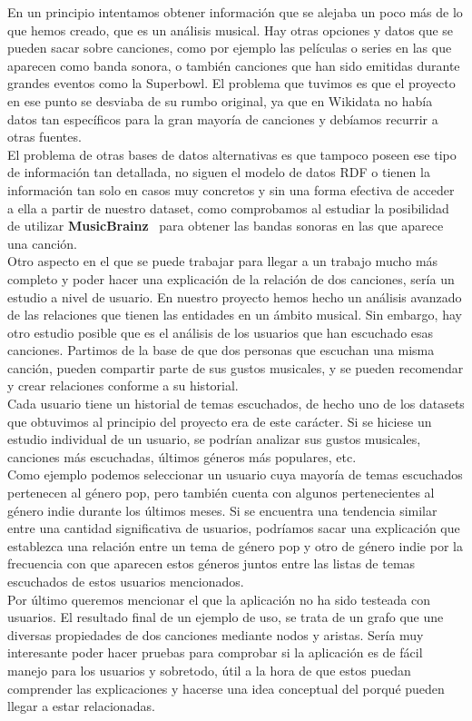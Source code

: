 En un principio intentamos obtener información que se alejaba un poco más de lo que hemos creado, que es un análisis musical. Hay otras opciones y datos que se pueden sacar sobre canciones, como por ejemplo las películas o series en las que aparecen como banda sonora, o también canciones que han sido emitidas durante grandes eventos como la Superbowl. El problema que tuvimos es que el proyecto en ese punto se desviaba de su rumbo original, ya que en Wikidata no había datos tan específicos para la gran mayoría de canciones y debíamos recurrir a otras fuentes.\\

El problema de otras bases de datos alternativas es que tampoco poseen ese tipo de información tan detallada, no siguen el modelo de datos RDF o tienen la información tan solo en casos muy concretos y sin una forma efectiva de acceder a ella a partir de nuestro dataset, como comprobamos al estudiar la posibilidad de utilizar \textbf{MusicBrainz}~\cite{musicbrainz} para obtener las bandas sonoras en las que aparece una canción.\\

Otro aspecto en el que se puede trabajar para llegar a un trabajo mucho más completo y poder hacer una explicación de la relación de dos canciones, sería un estudio a nivel de usuario.
En nuestro proyecto hemos hecho un análisis avanzado de las relaciones que tienen las entidades en un ámbito musical. Sin embargo, hay otro estudio posible que es el análisis de los usuarios que han escuchado esas canciones. Partimos de la base de que dos personas que escuchan una misma canción, pueden compartir parte de sus gustos musicales, y se pueden recomendar y crear relaciones conforme a su historial.\\

Cada usuario tiene un historial de temas escuchados, de hecho uno de los datasets que obtuvimos al principio del proyecto era de este carácter. Si se hiciese un estudio individual de un usuario, se podrían analizar sus gustos musicales, canciones más escuchadas, últimos géneros más populares, etc.\\

Como ejemplo podemos seleccionar un usuario cuya mayoría de temas escuchados pertenecen al género pop, pero también cuenta con algunos pertenecientes al género indie durante los últimos meses. Si se encuentra una tendencia similar entre una cantidad significativa de usuarios, podríamos sacar una explicación que establezca una relación entre un tema de género pop y otro de género indie por la frecuencia con que aparecen estos géneros juntos entre las listas de temas escuchados de estos usuarios mencionados.\\

Por último queremos mencionar el que la aplicación no ha sido testeada con usuarios. El resultado final de un ejemplo de uso, se trata de un grafo que une diversas propiedades de dos canciones mediante nodos y aristas. Sería muy interesante poder hacer pruebas para comprobar si la aplicación es de fácil manejo para los usuarios y sobretodo, útil a la hora de que estos puedan comprender las explicaciones y hacerse una idea conceptual del porqué pueden llegar a estar relacionadas. 


